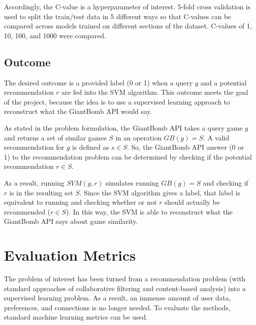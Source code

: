 \documentclass[10pt,twocolumn]{article}
\begin{document}
Accordingly, the C-value is a hyperparameter of interest. 5-fold cross validation is used to split the train/test data in 5 different ways so that C-values can be compared across models trained on different sections of the dataset. C-values of 1, 10, 100, and 1000 were compared.

\subsection{Outcome}
The desired outcome is a provided label (0 or 1) when a query $g$ and a potential recommendation $r$ are fed into the SVM algorithm. This outcome meets the goal of the project, because the idea is to use a supervised learning approach to reconstruct what the GiantBomb API would say. 

As stated in the problem formulation, the GiantBomb API takes a query game $g$ and returns a set of similar games $S$ in an operation $GB(g) = S$. A valid recommendation for $g$ is defined as $s \in S$. So, the GiantBomb API answer (0 or 1) to the recommendation problem can be determined by checking if the potential recommendation $r \in S$. 

As a result, running $SVM(g, r)$ simulates running $GB(g) = S$ and checking if $r$ is in the resulting set $S$. Since the SVM algorithm gives a label, that label is equivalent to running and checking whether or not $r$ should actually be recommended ($r \in S$). In this way, the SVM is able to reconstruct what the GiantBomb API says about game similarity.

\section{Evaluation Metrics}



The problem of interest has been turned from a recommendation problem (with standard approaches of collaborative filtering and content-based analysis) into a supervised learning problem. As a result, an immense amount of user data, preferences, and connections is no longer needed. To evaluate the methods, standard machine learning metrics can be used.
\end{document}
